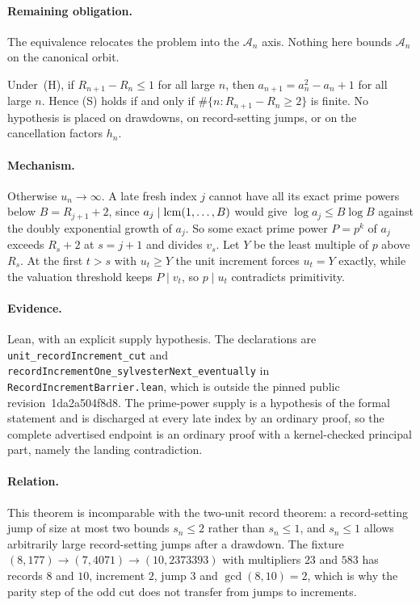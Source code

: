 \documentclass[11pt]{article}
\renewcommand{\commitshort}{1da2a504f8d8}
\begin{document}
\paragraph{Remaining obligation.}
The equivalence relocates the problem into the $\mathcal A_n$ axis.  Nothing
here bounds $\mathcal A_n$ on the canonical orbit.

\begin{theorem}\label{long243:res:unitrecord}
Under~(H), if $R_{n+1}-R_n\le1$ for all large $n$, then $a_{n+1}=a_n^2-a_n+1$
for all large $n$.  Hence (S) holds if and only if
$\#\{n:R_{n+1}-R_n\ge2\}$ is finite.  No hypothesis is placed on drawdowns, on
record-setting jumps, or on the cancellation factors $h_n$.
\end{theorem}

\paragraph{Mechanism.}
Otherwise $u_n\to\infty$.  A late fresh index $j$ cannot have all its exact prime
powers below $B=R_{j+1}+2$, since $a_j\mid\operatorname{lcm}(1,\ldots,B)$ would give
$\log a_j\le B\log B$ against the doubly exponential growth of $a_j$.  So some
exact prime power $P=p^{k}$ of $a_j$ exceeds $R_s+2$ at $s=j+1$ and divides
$v_s$.  Let $Y$ be the least multiple of $p$ above $R_s$.  At the first $t>s$
with $u_t\ge Y$ the unit increment forces $u_t=Y$ exactly, while the valuation
threshold keeps $P\mid v_t$, so $p\mid u_t$ contradicts primitivity.

\paragraph{Evidence.}
Lean, with an explicit supply hypothesis.  The declarations are
\texttt{unit\_recordIncrement\_cut} and
\texttt{recordIncrementOne\_sylvesterNext\_eventually} in
\texttt{RecordIncrementBarrier.lean}, which is outside the pinned public
revision~\commitshort.  The prime-power supply is a hypothesis of the formal
statement and is discharged at every late index by an ordinary proof, so the
complete advertised endpoint is an ordinary proof with a kernel-checked
principal part, namely the landing contradiction.

\paragraph{Relation.}
This theorem is incomparable with the two-unit record theorem: a record-setting
jump of size at most two bounds $s_n\le2$ rather than $s_n\le1$, and $s_n\le1$
allows arbitrarily large record-setting jumps after a drawdown.  The fixture
$(8,177)\to(7,4071)\to(10,2373393)$ with multipliers $23$ and $583$ has records
$8$ and $10$, increment $2$, jump $3$ and $\gcd(8,10)=2$, which is why the
parity step of the odd cut does not transfer from jumps to increments.
\end{document}
